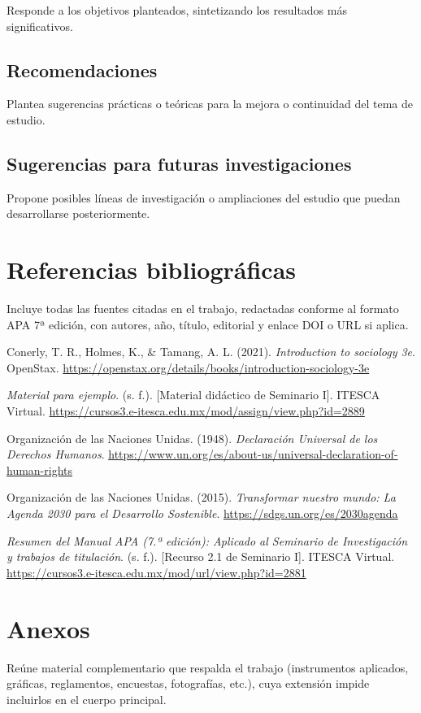 Responde a los objetivos planteados, sintetizando los resultados más significativos.

\subsection{Recomendaciones}

Plantea sugerencias prácticas o teóricas para la mejora o continuidad del tema de estudio.

\subsection{Sugerencias para futuras investigaciones}

Propone posibles líneas de investigación o ampliaciones del estudio que puedan desarrollarse posteriormente.

\clearpage\section{Referencias bibliográficas}

Incluye todas las fuentes citadas en el trabajo, redactadas conforme al formato APA 7ª edición, con autores, año, título, editorial y enlace DOI o URL si aplica.

\begin{apareferences}

\item Conerly, T. R., Holmes, K., \& Tamang, A. L. (2021). \emph{Introduction to sociology 3e}. OpenStax. \url{https://openstax.org/details/books/introduction-sociology-3e}

\item \emph{Material para ejemplo}. (s. f.). [Material didáctico de Seminario I]. ITESCA Virtual. \url{https://cursos3.e-itesca.edu.mx/mod/assign/view.php?id=2889}

\item Organización de las Naciones Unidas. (1948). \emph{Declaración Universal de los Derechos Humanos}. \url{https://www.un.org/es/about-us/universal-declaration-of-human-rights}

\item Organización de las Naciones Unidas. (2015). \emph{Transformar nuestro mundo: La Agenda 2030 para el Desarrollo Sostenible}. \url{https://sdgs.un.org/es/2030agenda}

\item \emph{Resumen del Manual APA (7.ª edición): Aplicado al Seminario de Investigación y trabajos de titulación}. (s. f.). [Recurso 2.1 de Seminario I]. ITESCA Virtual. \url{https://cursos3.e-itesca.edu.mx/mod/url/view.php?id=2881}

\end{apareferences}

\clearpage\section{Anexos}

Reúne material complementario que respalda el trabajo (instrumentos aplicados, gráficas, reglamentos, encuestas, fotografías, etc.), cuya extensión impide incluirlos en el cuerpo principal.

